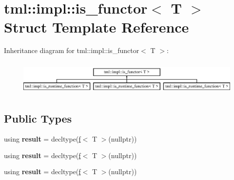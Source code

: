 \hypertarget{structtml_1_1impl_1_1is__functor}{\section{tml\+:\+:impl\+:\+:is\+\_\+functor$<$ T $>$ Struct Template Reference}
\label{structtml_1_1impl_1_1is__functor}
}
Inheritance diagram for tml\+:\+:impl\+:\+:is\+\_\+functor$<$ T $>$\+:\begin{figure}[H]
\begin{center}
\leavevmode
\includegraphics[height=1.786284cm]{structtml_1_1impl_1_1is__functor}
\end{center}
\end{figure}
\subsection*{Public Types}
\begin{DoxyCompactItemize}
\item 
\hypertarget{structtml_1_1impl_1_1is__functor_a348030d461216e40f41f079712f21aec}{using {\bfseries result} = decltype(\hyperlink{structf}{f}$<$ T $>$(nullptr))}\label{structtml_1_1impl_1_1is__functor_a348030d461216e40f41f079712f21aec}

\item 
\hypertarget{structtml_1_1impl_1_1is__functor_a348030d461216e40f41f079712f21aec}{using {\bfseries result} = decltype(\hyperlink{structf}{f}$<$ T $>$(nullptr))}\label{structtml_1_1impl_1_1is__functor_a348030d461216e40f41f079712f21aec}

\item 
\hypertarget{structtml_1_1impl_1_1is__functor_a348030d461216e40f41f079712f21aec}{using {\bfseries result} = decltype(\hyperlink{structf}{f}$<$ T $>$(nullptr))}\label{structtml_1_1impl_1_1is__functor_a348030d461216e40f41f079712f21aec}

\end{DoxyCompactItemize}
